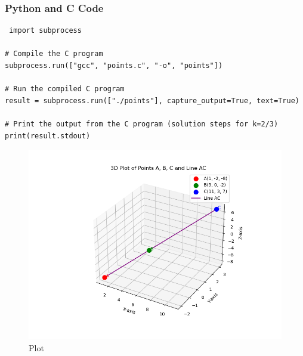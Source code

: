 \documentclass{beamer}
\begin{document}
\begin{frame}[fragile]
\frametitle{Python and C Code}

\begin{lstlisting}
 import subprocess

# Compile the C program
subprocess.run(["gcc", "points.c", "-o", "points"])

# Run the compiled C program
result = subprocess.run(["./points"], capture_output=True, text=True)

# Print the output from the C program (solution steps for k=2/3)
print(result.stdout) 

\end{lstlisting}

\end{frame}

 


\begin{figure}
    \centering
    \includegraphics[width=0.8\columnwidth]{figs/Fig.png}
    \caption{Plot}
    \label{fig:placeholder}
\end{figure}
\end{document}
